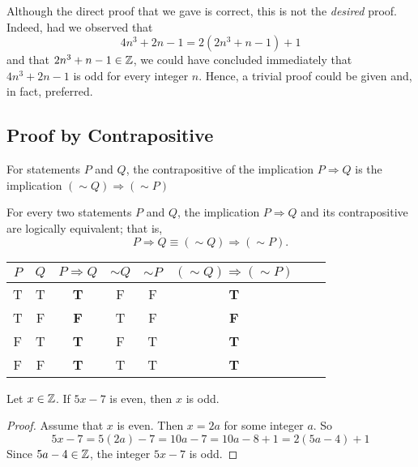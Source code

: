 Although the direct proof that we gave is correct, this is not the
\emph{desired} proof. Indeed, had we observed that  
\begin{equation*}
    4n^3+2n-1 = 2(2n^3+n-1)+1
\end{equation*}
and that $2n^3+n-1 \in \mathbb{Z}$, we could have concluded immediately that
$4n^3+2n-1$ is odd for every integer $n$. Hence, a trivial proof could be
given and, in fact, preferred.  

\subsection{Proof by Contrapositive}
\begin{defi}
    For statements $P$ and $Q$, the contrapositive of the implication $P
    \Rightarrow Q$ is the implication $(\sim Q) \Rightarrow (\sim P)$
\end{defi}
\begin{thm}
    For every two statements $P$ and $Q$, the implication $P \Rightarrow Q$ and
    its contrapositive are logically equivalent; that is,
    \begin{equation*}
        P\Rightarrow Q \equiv (\sim Q) \Rightarrow (\sim P).
    \end{equation*}
    \begin{center}
        \begin{tabular}{cccccccc}
          \toprule
          $P$ & $Q$ &$P \Rightarrow Q$ & $ \sim Q$ & $ \sim P$ & 
          $(\sim Q) \Rightarrow (\sim P)$ \\
          \midrule
          T & T & \textbf{T} & F & F & \textbf{T} \\
          T & F & \textbf{F} & T & F & \textbf{F} \\
          F & T & \textbf{T} & F & T & \textbf{T} \\
          F & F & \textbf{T} & T & T & \textbf{T} \\
          \bottomrule
        \end{tabular}
      \end{center}
\end{thm}
\begin{eg}
     Let $x \in \mathbb{Z}$. If $5x-7$ is even, then $x$ is odd.
     \begin{proof}
        Assume that $x$ is even. Then $x = 2a$ for some integer $a$. So
        \begin{equation*}
            5x-7=5(2a)-7=10a-7=10a-8+1=2(5a-4)+1
        \end{equation*}
        Since $5a-4 \in \mathbb{Z}$, the integer $5x-7$ is odd.
     \end{proof}
\end{eg}

